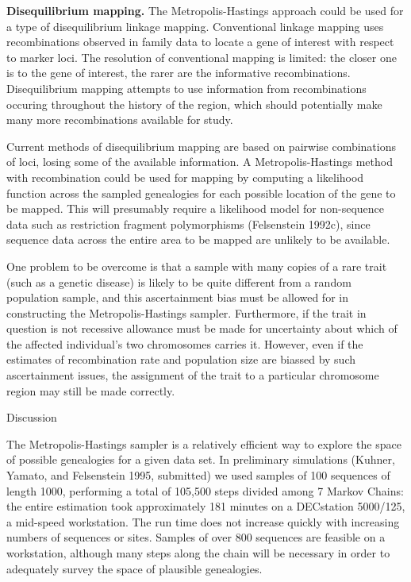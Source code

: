 {\bf Disequilibrium mapping.}
The Metropolis-Hastings approach could be used for a type of
disequilibrium linkage mapping.  Conventional linkage mapping uses
recombinations observed in family data to locate a gene of interest with
respect to marker loci.  The resolution of conventional mapping is
limited:  the closer one is to the gene of interest, the rarer are the
informative recombinations.  Disequilibrium mapping attempts to use
information from recombinations occuring throughout the history of the
region, which should potentially make many more recombinations available
for study.

Current methods of disequilibrium mapping are based on pairwise
combinations of loci, losing some of the available information.  A
Metropolis-Hastings method with recombination could be used for mapping
by computing a likelihood function across the sampled genealogies for
each possible location of the gene to be mapped.  This will presumably
require a likelihood model for non-sequence data such as restriction
fragment polymorphisms (Felsenstein 1992c), since sequence data across the entire area to be
mapped are unlikely to be available.

One problem to be overcome is that a sample with many copies
of a rare trait (such as a genetic disease)
is likely to be quite different from a random population
sample, and this ascertainment bias must be allowed for in constructing
the Metropolis-Hastings sampler.  Furthermore, if the trait in question
is not recessive allowance must be made for uncertainty about which of
the affected individual's two chromosomes carries it.  However, even if
the estimates of recombination rate and population size are biassed by
such ascertainment issues, the assignment of the trait to a particular
chromosome region may still be made correctly.

\bigskip
{\center Discussion}
\bigskip

The Metropolis-Hastings sampler is a relatively efficient way to explore
the space of possible genealogies for a given data set. 
In preliminary simulations (Kuhner, Yamato, and Felsenstein 1995,
submitted) we used samples of 100 sequences of length 1000, performing
a total of 105,500 steps divided among 7 Markov Chains:  the entire
estimation took approximately 181 minutes on
a DECstation 5000/125, a mid-speed workstation.  The run time
does not increase quickly with increasing numbers of sequences or
sites.  Samples of over 800 sequences are feasible on 
a workstation, although many steps along the chain will be necessary
in order to adequately survey the space of plausible genealogies.

